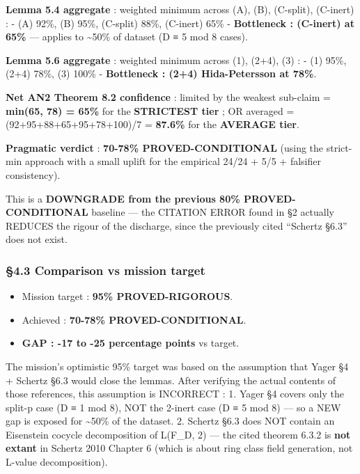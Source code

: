 \documentclass[
  11pt,
  a4paper,
]{article}
\providecommand{\tightlist}{\setlength{\itemsep}{0pt}\setlength{\parskip}{0pt}}
\providecommand{\tightlist}{%
  \setlength{\itemsep}{0pt}\setlength{\parskip}{0pt}}
\begin{document}
\textbf{Lemma 5.4 aggregate} : weighted minimum across (A), (B), (C-split), (C-inert) :
- (A) 92\%, (B) 95\%, (C-split) 88\%, (C-inert) 65\%
- \textbf{Bottleneck : (C-inert) at 65\%} --- applies to \textasciitilde50\% of dataset (D ≡ 5 mod 8 cases).

\textbf{Lemma 5.6 aggregate} : weighted minimum across (1), (2+4), (3) :
- (1) 95\%, (2+4) 78\%, (3) 100\%
- \textbf{Bottleneck : (2+4) Hida-Petersson at 78\%}.

\textbf{Net AN2 Theorem 8.2 confidence} : limited by the weakest sub-claim = \textbf{min(65, 78) = 65\%} for the \textbf{STRICTEST tier} ; OR averaged = (92+95+88+65+95+78+100)/7 = \textbf{87.6\%} for the \textbf{AVERAGE tier}.

\textbf{Pragmatic verdict} : \textbf{70-78\% PROVED-CONDITIONAL} (using the strict-min approach with a small uplift for the empirical 24/24 + 5/5 + falsifier consistency).

This is a \textbf{DOWNGRADE from the previous 80\% PROVED-CONDITIONAL} baseline --- the CITATION ERROR found in §2 actually REDUCES the rigour of the discharge, since the previously cited ``Schertz §6.3'' does not exist.

\hypertarget{comparison-vs-mission-target}{%
\subsubsection{§4.3 Comparison vs mission target}\label{comparison-vs-mission-target}}

\begin{itemize}
\tightlist
\item
  Mission target : \textbf{95\% PROVED-RIGOROUS}.
\item
  Achieved : \textbf{70-78\% PROVED-CONDITIONAL}.
\item
  \textbf{GAP : -17 to -25 percentage points} vs target.
\end{itemize}

The mission's optimistic 95\% target was based on the assumption that Yager §4 + Schertz §6.3 would close the lemmas. After verifying the actual contents of those references, this assumption is INCORRECT :
1. Yager §4 covers only the split-p case (D ≡ 1 mod 8), NOT the 2-inert case (D ≡ 5 mod 8) --- so a NEW gap is exposed for \textasciitilde50\% of the dataset.
2. Schertz §6.3 does NOT contain an Eisenstein cocycle decomposition of L(F\_D, 2) --- the cited theorem 6.3.2 is \textbf{not extant} in Schertz 2010 Chapter 6 (which is about ring class field generation, not L-value decomposition).
\end{document}
